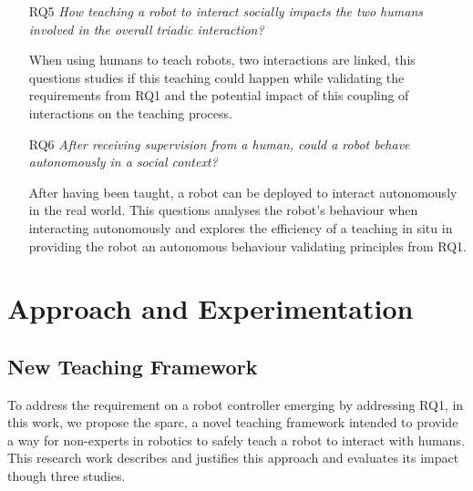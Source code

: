 \begin{itemize}
	\item [RQ5] \emph{How teaching a robot to interact socially impacts the two humans involved in the overall triadic interaction?}
	
		When using humans to teach robots, two interactions are linked, this questions studies if this teaching could happen while validating the requirements from RQ1 and the potential impact of this coupling of interactions on the teaching process.
		
    \item [RQ6] \emph{After receiving supervision from a human, could a robot behave autonomously in a social context?}

	 	After having been taught, a robot can be deployed to interact autonomously in the real world. This questions analyses the robot's behaviour when interacting autonomously and explores the efficiency of a teaching in situ in providing the robot an autonomous behaviour validating principles from RQ1.
	 
\end{itemize}

\section{Approach and Experimentation}

\subsection{New Teaching Framework}
To address the requirement on a robot controller emerging by addressing RQ1, in this work, we propose the \gls{sparc}, a novel teaching framework intended to provide a way for non-experts in robotics to safely teach a robot to interact with humans. This research work describes and justifies this approach and evaluates its impact though three studies.

